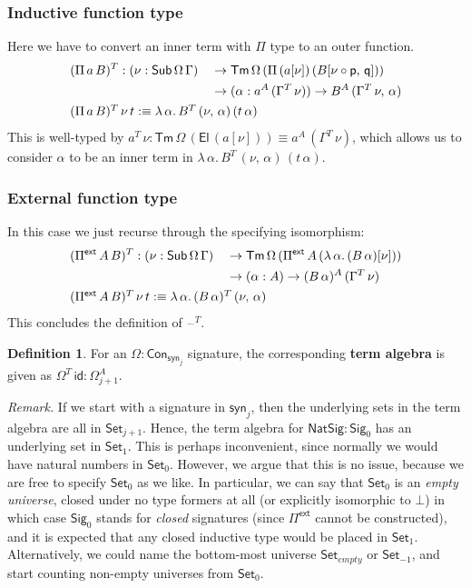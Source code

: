 \documentclass[12pt,a4paper,twoside,openany]{book}
\theoremstyle{remark}
\theoremstyle{definition}
\newtheorem{mydefinition}{Definition}
\theoremstyle{theorem}
\newcommand{\id}{\mathsf{id}}
\newcommand{\Con}{\mathsf{Con}}
\newcommand{\Sub}{\mathsf{Sub}}
\newcommand{\Tm}{\mathsf{Tm}}
\newcommand{\El}{\mathsf{El}}
\newcommand{\blank}{\mathord{\hspace{1pt}\text{--}\hspace{1pt}}}
\newcommand{\Set}{\mathsf{Set}}
\newcommand{\Pie}{\Pi^{\mathsf{ext}}}
\newcommand{\Sig}{\mathsf{Sig}}
\newcommand{\NatSig}{\mathsf{NatSig}}
\newcommand{\p}{\mathsf{p}}
\newcommand{\q}{\mathsf{q}}
\newcommand{\syn}{\mathsf{syn}}
\newcommand{\defn}{:\equiv}
\begin{document}
\subsubsection{Inductive function type}
Here we have to convert an inner term with $\Pi$ type to an outer function.
\begin{alignat*}{3}
  &(\Pi\,a\,B)^T : (\nu : \Sub\,\Omega\,\Gamma)
                 &&\to \Tm\,\Omega\,(\Pi\,(a[\nu])\,(B[\nu\circ\p,\,\q]))\\
  &              &&\to (\alpha : a^A\,(\Gamma^T\,\nu)) \to B^A\,(\Gamma^T\,\nu,\,\alpha)\\
  &\rlap{$(\Pi\,a\,B)^T\,\nu\,t \defn \lambda\,\alpha.\,B^T\,(\nu,\,\alpha)\,(t\,\alpha)$}
\end{alignat*}
This is well-typed by $a^T\,\nu :
\Tm\,\Omega\,(\El\,(a[\nu])) \equiv
a^A\,(\Gamma^T\,\nu)$, which allows us to consider $\alpha$ to be an inner term
in $\lambda\,\alpha.\,B^T\,(\nu,\,\alpha)\,(t\,\alpha)$.

\subsubsection{External function type}
In this case we just recurse through the specifying isomorphism:
\begin{alignat*}{3}
  &(\Pie\,A\,B)^T : (\nu : \Sub\,\Omega\,\Gamma)
                 &&\to \Tm\,\Omega\,(\Pie\,A\,(\lambda\,\alpha.\,(B\,\alpha)[\nu]))\\
  &              &&\to (\alpha : A) \to (B\,\alpha)^A\,(\Gamma^T\,\nu)\\
  &\rlap{$(\Pie\,A\,B)^T\,\nu\,t \defn \lambda\,\alpha.\,(B\,\alpha)^T\,(\nu,\,\alpha)$}
\end{alignat*}
This concludes the definition of $\blank^T$.

\begin{mydefinition}
For an $\Omega : \Con_{\syn_j}$ signature, the corresponding \textbf{term
algebra} is given as $\Omega^T\,\id : \Omega^A_{j+1}$.
\end{mydefinition}

\emph{Remark.} If we start with a signature in $\syn_j$, then the underlying
sets in the term algebra are all in $\Set_{j+1}$. Hence, the term algebra for
$\NatSig : \Sig_0$ has an underlying set in $\Set_1$. This is perhaps
inconvenient, since normally we would have natural numbers in $\Set_0$. However,
we argue that this is no issue, because we are free to specify $\Set_0$ as we
like. In particular, we can say that $\Set_0$ is an \emph{empty universe},
closed under no type formers at all (or explicitly isomorphic to $\bot$) in
which case $\Sig_0$ stands for \emph{closed} signatures (since $\Pie$ cannot be
constructed), and it is expected that any closed inductive type would be placed
in $\Set_1$. Alternatively, we could name the bottom-most universe
$\Set_{empty}$ or $\Set_{-1}$, and start counting non-empty universes from
$\Set_0$.
\end{document}

